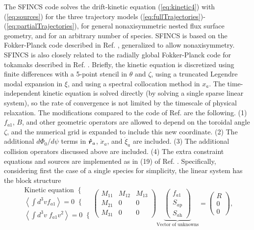 \documentclass[12pt]{revtex4}
\newcommand{\vect}[1]{\mbox{\boldmath $#1$}}
\newcommand{\Sap}{S_{a\mathrm{p}}}
\newcommand{\Sah}{S_{a\mathrm{h}}}
\begin{document}
The SFINCS code solves the drift-kinetic equation (\ref{eq:kinetic4})
with (\ref{eq:sources})
for the three trajectory models (\ref{eq:fullTrajectories})-(\ref{eq:partialTrajectories}),
for general nonaxisymmetric nested flux surface geometry, and for an arbitrary number of species.
SFINCS is based on the Fokker-Planck code described in Ref. \cite{speedGrids},
generalized to allow nonaxisymmetry.
SFINCS is also closely related to the radially global Fokker-Planck code for tokamaks described
in Ref. \cite{PERFECT}.
Briefly, the kinetic equation is discretized using finite differences with a 5-point stencil in $\theta$
and $\zeta$, using a truncated Legendre modal expansion in $\xi$, and using
a spectral collocation method in $x_a$.
The time-independent kinetic equation is solved directly (by solving a single sparse linear system),
so the rate of convergence is not limited by the timescale of physical relaxation.
The modifications compared to the code of Ref. \cite{speedGrids} are the following.
(1) $f_{a1}$, $B$, and other geometric operators are allowed to depend on the toroidal angle $\zeta$,
and the numerical grid is expanded to include this new coordinate.
(2) The additional $d\Phi_0/d\psi$ terms in $\vect{\dot{r}}_a$, $\dot{x}_a$, and $\dot{\xi}_a$
are included.
(3) The additional collision operators discussed above are included.
(4) The extra constraint equations and sources are implemented as in (19) of Ref. \cite{PERFECT}.
Specifically, considering first the case of a single species for simplicity, the linear system has the block structure
\begin{equation}
\begin{array}{r}
\mbox{Kinetic equation}\;\;\{ \\
\left<\int d^3v f_{a1}\right>=0 \;\;\{ \\
\left<\int d^3v\; f_{a1} v^2\right>=0\;\; \{
\end{array}
\left(\begin{array}{ccc}
M_{11} & M_{12} & M_{13} \\
M_{21} & 0 & 0 \\
M_{31} & 0 & 0 \end{array}
\right)
\underbrace{
\left(
\begin{array}{c}
f_{a1} \\
\Sap \\
\Sah \end{array}
\right)}_{\mbox{Vector of unknowns}}
 = \left(
\begin{array}{c}
R
 \\
0 \\
0 \end{array}
\right),
\label{eq:blocks}
\end{equation}
\end{document}
